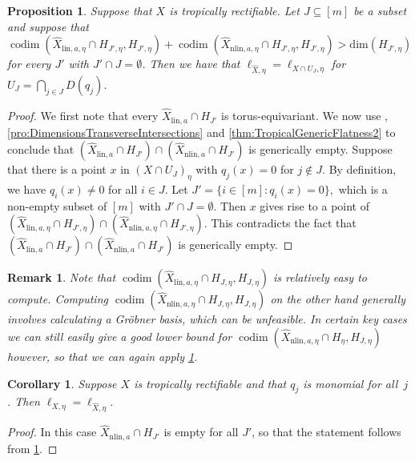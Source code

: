 \documentclass[12pt,reqno,a4paper]{amsart}
\theoremstyle{theoremstyle}
\newtheorem{proposition}[theorem]{Proposition}
\newtheorem{corollary}[theorem]{Corollary}
\theoremstyle{examplestyle}
\newtheorem{remark}[theorem]{Remark}
\theoremstyle{algorithmstyle}
\newcommand{\nlin}{{\mathrm{nlin}}}
\DeclareMathOperator{\codim}{codim}
\begin{document}
\begin{proposition}\label{pro:ExtendGRCOpenSubset}
  Suppose that $X$ is tropically rectifiable. Let $J\subseteq [m]$ be a subset and suppose that
  \begin{equation}
    \codim(\widehat{X}_{\mathrm{lin},a,\eta}\cap H_{J',\eta},H_{J',\eta})+\codim(\widehat{X}_{\mathrm{nlin},a,\eta}\cap{H}_{J',\eta},H_{J',\eta})>\mathrm{dim}(H_{J',\eta})
  \end{equation}
  for every $J'$ with $J'\cap J=\emptyset$. %
  Then we have that $\ell_{\widehat{X},\eta}=\ell_{X\cap U_J,\eta}$ for $U_J=\bigcap_{j\in J} D(q_j)$.
\end{proposition}
%
\begin{proof}
  We first note that every $\widehat{X}_{\mathrm{lin},a}\cap{H_{J'}}$ is torus-equivariant.  We now use \cite[Theorem 3.6.10]{MS15}, \cref{pro:DimensionsTransverseIntersections} and \cref{thm:TropicalGenericFlatness2} to conclude that $(\widehat{X}_{\mathrm{lin},a}\cap{H}_{J'})\cap (\widehat{X}_{\mathrm{nlin},a}\cap{H}_{J'})$ is generically empty.
  Suppose that there is a point $x$ in $(X\cap U_J)_{\eta}$ with $q_{j}(x)=0$ for $j\notin J$. By definition, we have $q_{i}(x)\neq{0}$ for all $i\in{J}$.  %
  Let $J'=\{i\in[m]:q_{i}(x)=0\},$ which is a non-empty subset of $[m]$ with $J'\cap J=\emptyset$. %
  Then $x$ gives rise to a point of %
  $(\widehat{X}_{\mathrm{lin},a,\eta}\cap{H}_{J',\eta})\cap (\widehat{X}_{\mathrm{nlin},a,\eta}\cap{H}_{J',\eta})$. This contradicts the fact that $(\widehat{X}_{\mathrm{lin},a}\cap{H}_{J'})\cap (\widehat{X}_{\mathrm{nlin},a}\cap{H}_{J'})$ is generically empty.
\end{proof}

\begin{remark}
  Note that $\codim(\widehat{X}_{\mathrm{lin},a,\eta}\cap{H_{J,\eta}},H_{J,\eta})$ is relatively easy to compute.
  Computing $\codim(\widehat{X}_{\mathrm{nlin},a,\eta}\cap{H_{J,\eta}},H_{J,\eta})$ on the other hand generally involves calculating a Gr\"{o}bner basis, which can be unfeasible.
  In certain key cases we can still easily give a good lower bound for $\codim(\widehat{X}_{\mathrm{nlin},a,\eta}\cap{H_{\eta}},H_{J,\eta})$ however, so that we can again apply \cref{pro:ExtendGRCOpenSubset}.
\end{remark}

\begin{corollary}\label{cor:MonomialMCS}
  Suppose $X$ is tropically rectifiable and that $q_{j}$ is monomial for all~$j$. Then $\ell_{X,\eta}=\ell_{\widehat{X},\eta}$.
\end{corollary}
\begin{proof}
  In this case $\widehat{X}_{\nlin,a}\cap H_{J'}$ is empty for all $J'$, so that the statement follows from \cref{pro:ExtendGRCOpenSubset}.  %
\end{proof}
\end{document}
